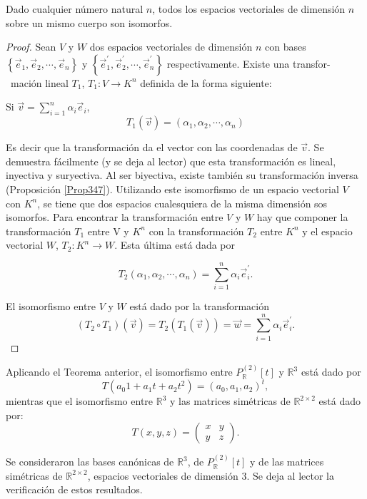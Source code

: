 \bigskip

\begin{corollary}
\label{Prop348}

Dado cualquier número natural $n$, todos los espacios vectoriales de dimensión $n$ sobre un mismo cuerpo son isomorfos.

\bigskip


\begin{proof}Sean $V$ y $W$ dos espacios vectoriales de dimensión $n$ con bases $\left\{\vec{e}_1,\vec{e}_2,\cdots, \vec{e}_n\right\}$ y $\left\{\vec{e}^{\prime}_1,\vec{e}^{\prime}_2,\cdots, \vec{e}^{\prime}_n\right\}$ respectivamente. 
Existe una transfor-\ mación lineal $T_1$, $T_1: V \rightarrow K^n$ definida de la forma siguiente:

\bigskip

Si $\Vec{v}=\sum_{i=1}^n \alpha_i \vec{e}_i$, $$T_1(\Vec{v})=(\alpha_1, \alpha_2, \cdots , \alpha_n) $$


\bigskip

Es decir que la transformación da el vector con las coordenadas de $\Vec{v}$.
Se demuestra fácilmente (y se deja al lector) que esta transformación es lineal, inyectiva y suryectiva. Al ser biyectiva, existe también su transformación inversa  (Proposición \ref{Prop347}).
Utilizando este isomorfismo de un espacio vectorial $V$ con $K^n$, se tiene que dos espacios cualesquiera de la misma dimensión sos isomorfos. Para encontrar la transformación entre $V$ y $W$ hay que  componer la transformación  $T_1$ entre V y  $K^n$ con la transformación $T_2$ entre   $K^n$ y el espacio vectorial $W$, $T_2: K^n  \rightarrow  W$.
Esta última está dada por

$$T_2(\alpha_1, \alpha_2, \cdots , \alpha_n) = \sum_{i=1}^n \alpha_i \vec{e}^{\prime}_i.$$

\bigskip

El isomorfismo entre $V$ y $W$ está dado por la transformación $$(T_2 \circ T_1)(\Vec{v})=T_2(T_1(\Vec{v}))=\Vec{w}= \sum_{i=1}^n \alpha_i \vec{e}^{\prime}_i  .$$
\end{proof}
\end{corollary} 

\bigskip

\begin{example}
 Aplicando el Teorema anterior, el isomorfismo entre $P_{\mathbb{R}}^{(2)}[t]$ y  $\mathbb{R}^3$  está dado por 
$$T( a_0 1+ a_1 t + a_2 t^2)= (a_0, a_1, a_2)^t,$$
mientras que el isomorfismo entre   $\mathbb{R}^3$ y las matrices simétricas  de $\mathbb{R}^{2\times2 }$  está dado por:
$$T(x,y,z)= \left(   \begin{array}{cc} x & y \\ y & z   \end{array} \right ).$$

\bigskip

Se consideraron  las bases canónicas de  $\mathbb{R}^3$, de $P_{\mathbb{R}}^{(2)}[t]$ y  de las matrices simétricas de $\mathbb{R}^{2\times2 }$,  espacios vectoriales de dimensión $3$. 
Se deja al lector la verificación de estos resultados.
\end{example}

